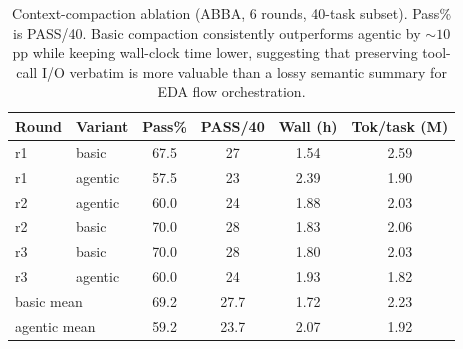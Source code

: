\begin{table}[ht]
\centering
\small
\caption{Context-compaction ablation (ABBA, 6 rounds, 40-task subset). Pass\% is
PASS/40. Basic compaction consistently outperforms agentic by ${\sim}10$pp while
keeping wall-clock time lower, suggesting that preserving tool-call I/O verbatim
is more valuable than a lossy semantic summary for EDA flow orchestration.}
\label{tab:compaction-ablation}
\footnotesize
\setlength{\tabcolsep}{4pt}
\begin{tabular}{@{}llcccc@{}}
\toprule
\textbf{Round} & \textbf{Variant} & \textbf{Pass\%} & \textbf{PASS/40} & \textbf{Wall (h)} & \textbf{Tok/task (M)} \\
\midrule
r1 & basic   & 67.5 & 27 & 1.54 & 2.59 \\
r1 & agentic & 57.5 & 23 & 2.39 & 1.90 \\
r2 & agentic & 60.0 & 24 & 1.88 & 2.03 \\
r2 & basic   & 70.0 & 28 & 1.83 & 2.06 \\
r3 & basic   & 70.0 & 28 & 1.80 & 2.03 \\
r3 & agentic & 60.0 & 24 & 1.93 & 1.82 \\
\midrule
\multicolumn{2}{l}{basic mean}   & 69.2 & 27.7 & 1.72 & 2.23 \\
\multicolumn{2}{l}{agentic mean} & 59.2 & 23.7 & 2.07 & 1.92 \\
\bottomrule
\end{tabular}
\end{table}

